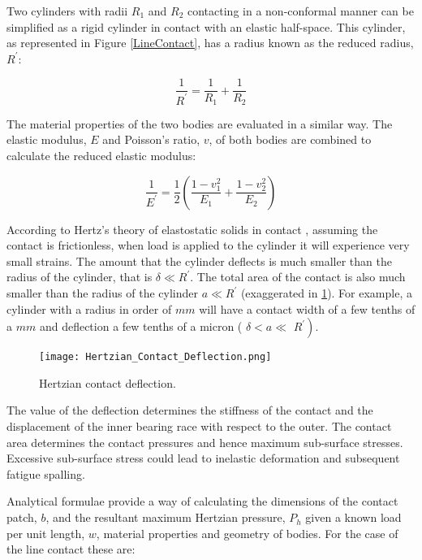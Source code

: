 Two cylinders with radii $R_1$ and $R_2$ contacting in a non-conformal manner can be simplified as a rigid cylinder in contact with an elastic half-space. This cylinder, as represented in Figure \ref{LineContact}, has a radius known as the reduced radius, $R^{\prime}$:

\begin{equation}\label{eq2.1}
	\frac{1}{R^{\prime}}=\frac{1}{R_1}+\frac{1}{R_2}
\end{equation}

The material properties of the two bodies are evaluated in a similar way. The elastic modulus, $E$ and Poisson's ratio, $v$, of both bodies are combined to calculate the reduced elastic modulus:

\begin{equation}\label{eq2.2}
	\frac{1}{E^{\prime}}=\frac{1}{2}\left(\frac{1-v_1^2}{E_1}+\frac{1-v_2^2}{E_2}\right)
\end{equation}

According to Hertz's theory of elastostatic solids in contact \cite{Hertz1881}, assuming the contact is frictionless, when load is applied to the cylinder it will experience very small strains. The amount that the cylinder deflects is much smaller than the radius of the cylinder, that is $\delta \ll R^{\prime}$. The total area of the contact is also much smaller than the radius of the cylinder $a \ll R^{\prime}$ (exaggerated in \ref{HertzianContactDeflection}). For example, a cylinder with a radius in order of $mm$ will have a contact width of a few tenths of a $mm$ and deflection a few tenths of a micron ( $\delta<a \ll$ $\left.R^{\prime}\right)$.

\begin{figure}
	\centerline{\texttt{[image: Hertzian\_Contact\_Deflection.png]}}
	\caption{Hertzian contact deflection.}
	\label{HertzianContactDeflection}
\end{figure}

The value of the deflection determines the stiffness of the contact and the displacement of the inner bearing race with respect to the outer. The contact area determines the contact pressures and hence maximum sub-surface stresses. Excessive sub-surface stress could lead to inelastic deformation and subsequent fatigue spalling.

Analytical formulae provide a way of calculating the dimensions of the contact patch, $b$, and the resultant maximum Hertzian pressure, $P_h$ given a known load per unit length, $w$, material properties and geometry of bodies. For the case of the line contact these are:

